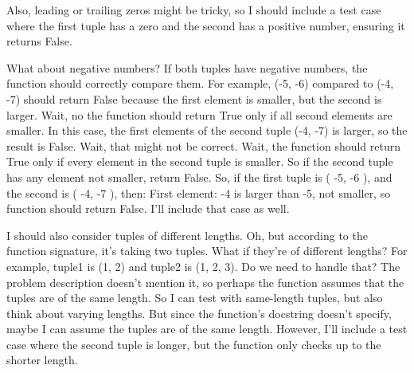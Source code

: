 \begin{figure*}[ht!]
\begin{tcolorbox}[title={DeepSeek-R1-Distill-Qwen-32B Reasoning Trace}, colback=red!0, left=2pt,right=2pt,top=2pt,bottom=2pt]
{Also, leading or trailing zeros might be tricky, so I should include a test case where the first tuple has a zero and the second has a positive number, ensuring it returns False.

\vspace{0.3cm}

What about negative numbers? If both tuples have negative numbers, the function should correctly compare them. For example, (-5, -6) compared to (-4, -7) should return False because the first element is smaller, but the second is larger. Wait, no the function should return True only if all second elements are smaller. In this case, the first elements of the second tuple (-4, -7) is larger, so the result is False. Wait, that might not be correct. Wait, the function should return True only if every element in the second tuple is smaller. So if the second tuple has any element not smaller, return False. So, if the first tuple is ( -5, -6 ), and the second is ( -4, -7 ), then: First element: -4 is larger than -5, not smaller, so function should return False. I'll include that case as well.

\vspace{0.3cm}

I should also consider tuples of different lengths. Oh, but according to the function signature, it's taking two tuples. What if they're of different lengths? For example, tuple1 is (1, 2) and tuple2 is (1, 2, 3). Do we need to handle that? The problem description doesn't mention it, so perhaps the function assumes that the tuples are of the same length. So I can test with same-length tuples, but also think about varying lengths. But since the function's docstring doesn't specify, maybe I can assume the tuples are of the same length. However, I'll include a test case where the second tuple is longer, but the function only checks up to the shorter length. 

}
\end{tcolorbox}


  \caption{DeepSeek-R1-Distill-Qwen-32B reasoning trace example}
  \label{fig:reasoning_cot}
  \vspace{-0.2in}
\end{figure*}

\vspace{0.3in}